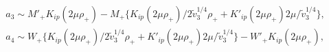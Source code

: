 \begin{equation}\label{match1}\begin{array}{ll}a_3\sim
M'_{+}K_{ip}(2\mu\rho_{+})-M_{+}\{K_{ip}(2\mu\rho_{+})/2\tilde{v}_3^{1/4}\rho_{+}+
K'_{ip}(2\mu\rho_{+})2\mu/\tilde{v}_3^{1/4}\},\\
a_4\sim
W_{+}\{K_{ip}(2\mu\rho_{+})/2\tilde{v}_3^{1/4}\rho_{+}+K'_{ip}(2\mu\rho_{+})2\mu/\tilde{v}_3^{1/4}\}-W'_{+}K_{ip}(2\mu\rho_{+}),\end{array}\end{equation}

